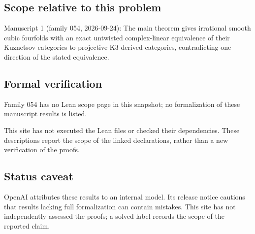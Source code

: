 \documentclass[11pt]{article}
\begin{document}
\subsection{Scope relative to this problem}
Manuscript 1 (family 054, 2026-09-24): The main theorem gives irrational smooth cubic fourfolds with an exact untwisted complex-linear equivalence of their Kuznetsov categories to projective K3 derived categories, contradicting one direction of the stated equivalence.

\subsection{Formal verification}
Family 054 has no Lean scope page in this snapshot; no formalization of these manuscript results is listed.

This site has not executed the Lean files or checked their dependencies. These descriptions report the scope of the linked declarations, rather than a new verification of the proofs.

\subsection{Status caveat}
OpenAI attributes these results to an internal model. Its release notice cautions that results lacking full formalization can contain mistakes. This site has not independently assessed the proofs; a solved label records the scope of the reported claim.
\end{document}
